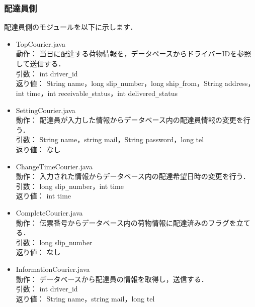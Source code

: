 \documentclass[a4j,titlepage]{jarticle}
\begin{document}
\subsubsection{配達員側}
配達員側のモジュールを以下に示します．
\begin{itemize}
\item TopCourier.java\\
動作： 当日に配達する荷物情報を，データベースからドライバーIDを参照して送信する．\\
引数： int driver\verb|_|id\\
返り値： String name，long slip\verb|_|number，long ship\verb|_|from，String address，int time，int receivable\verb|_|status，int delivered\verb|_|status
\item SettingCourier.java\\
動作： 配達員が入力した情報からデータベース内の配達員情報の変更を行う．\\
引数： String name，string mail，String password，long tel\\
返り値： なし
\item ChangeTimeCourier.java\\
動作： 入力された情報からデータベース内の配達希望日時の変更を行う．\\
引数： long slip\verb|_|number，int time\\
返り値： int time
\item CompleteCourier.java\\
動作： 伝票番号からデータベース内の荷物情報に配達済みのフラグを立てる．\\
引数： long slip\verb|_|number\\
返り値： なし
\item  InformationCourier.java\\
動作： データベースから配達員の情報を取得し，送信する．\\
引数： int driver\verb|_|id\\
返り値： String name，string mail，long tel
\end{itemize}
\end{document}
